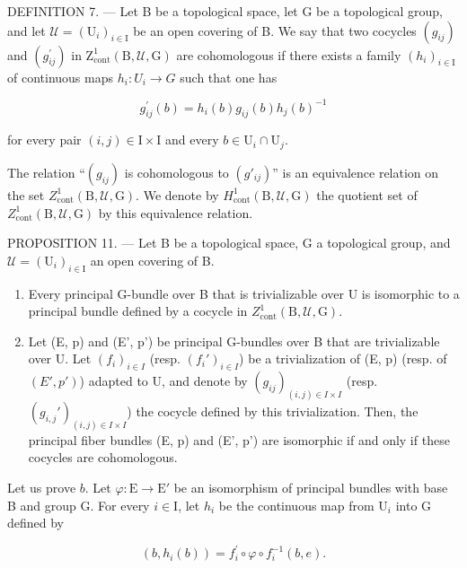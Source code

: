 DEFINITION 7. --- Let B be a topological space, let G be a topological group, and let \(\mathcal{U} = (\mathrm{U}_{i})_{i\in \mathrm{I}}\) be an open covering of B. We say that two cocycles \((g_{ij})\) and \((g_{ij}^{\prime})\) in \(\mathrm{Z}_{\mathrm{cont}}^{1}(\mathrm{B},\mathcal{U},\mathrm{G})\) are cohomologous if there exists a family \((h_{i})_{i\in\mathrm{I}}\) of continuous maps \(h_{i}\colon U_{i}\to G\) such that one has

\[
g _ {i j} ^ {\prime} (b) = h _ {i} (b) g _ {i j} (b) h _ {j} (b) ^ {- 1}\tag{6}
\]

for every pair \((i,j)\in \mathrm{I}\times \mathrm{I}\) and every \(b\in \mathrm{U}_i\cap \mathrm{U}_j\).

The relation “\((g_{ij})\) is cohomologous to \((g'_{ij})\)” is an equivalence relation on the set \(Z_{\mathrm{cont}}^{1}(\mathrm{B},\mathcal{U},\mathrm{G})\). We denote by \(H_{\mathrm{cont}}^{1}(\mathrm{B},\mathcal{U},\mathrm{G})\) the quotient set of \(Z_{\mathrm{cont}}^{1}(\mathrm{B},\mathcal{U},\mathrm{G})\) by this equivalence relation.

PROPOSITION 11. --- Let B be a topological space, G a topological group, and \(\mathcal{U} = (\mathrm{U}_{i})_{i\in \mathrm{I}}\) an open covering of B.

\begin{enumerate}
\def\labelenumi{\alph{enumi})}
\item
  Every principal G-bundle over B that is trivializable over U is isomorphic to a principal bundle defined by a cocycle in \(Z_{\mathrm{cont}}^{1}(\mathrm{B}, \mathcal{U}, \mathrm{G})\).
\item
  Let (E, p) and (E', p') be principal G-bundles over B that are trivializable over U. Let \((f_i)_{i \in I}\) (resp. \((f_i')_{i \in I}\)) be a trivialization of (E, p) (resp. of \((E', p')\)) adapted to U, and denote by \((g_{ij})_{(i,j) \in I \times I}\) (resp. \((g_{i,j}')_{(i,j) \in I \times I}\)) the cocycle defined by this trivialization. Then, the principal fiber bundles (E, p) and (E', p') are isomorphic if and only if these cocycles are cohomologous.
\end{enumerate}

Let us prove \(b\). Let \(\varphi: \mathrm{E} \to \mathrm{E}'\) be an isomorphism of principal bundles with base B and group G. For every \(i \in \mathrm{I}\), let \(h_i\) be the continuous map from \(\mathrm{U}_i\) into G defined by

\[
(b, h _ {i} (b)) = f _ {i} ^ {\prime} \circ \varphi \circ f _ {i} ^ {- 1} (b, e).
\]

